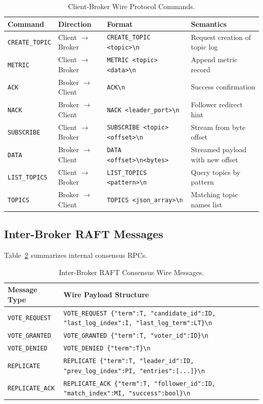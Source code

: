 \documentclass[11pt,a4paper]{article}
\begin{document}
\begin{table}[H]
\centering
\small
\begin{tabular}{@{}llll@{}}
\toprule
\textbf{Command} & \textbf{Direction} & \textbf{Format} & \textbf{Semantics} \\ \midrule
\texttt{CREATE\_TOPIC} & Client $\to$ Broker & \texttt{CREATE\_TOPIC <topic>\textbackslash n} & Request creation of topic log \\
\texttt{METRIC} & Client $\to$ Broker & \texttt{METRIC <topic> <data>\textbackslash n} & Append metric record \\
\texttt{ACK} & Broker $\to$ Client & \texttt{ACK\textbackslash n} & Success confirmation \\
\texttt{NACK} & Broker $\to$ Client & \texttt{NACK <leader\_port>\textbackslash n} & Follower redirect hint \\
\texttt{SUBSCRIBE} & Client $\to$ Broker & \texttt{SUBSCRIBE <topic> <offset>\textbackslash n} & Stream from byte offset \\
\texttt{DATA} & Broker $\to$ Client & \texttt{DATA <offset>\textbackslash n<bytes>} & Streamed payload with new offset \\
\texttt{LIST\_TOPICS} & Client $\to$ Broker & \texttt{LIST\_TOPICS <pattern>\textbackslash n} & Query topics by pattern \\
\texttt{TOPICS} & Broker $\to$ Client & \texttt{TOPICS <json\_array>\textbackslash n} & Matching topic names list \\ \bottomrule
\end{tabular}
\caption{Client-Broker Wire Protocol Commands.}
\label{tab:client_protocol}
\end{table}

\subsection{Inter-Broker RAFT Messages}
Table~\ref{tab:raft_protocol} summarizes internal consensus RPCs.

\begin{table}[H]
\centering
\small
\begin{tabular}{@{}ll@{}}
\toprule
\textbf{Message Type} & \textbf{Wire Payload Structure} \\ \midrule
\texttt{VOTE\_REQUEST} & \texttt{VOTE\_REQUEST \{"term":T, "candidate\_id":ID, "last\_log\_index":I, "last\_log\_term":LT\}\textbackslash n} \\
\texttt{VOTE\_GRANTED} & \texttt{VOTE\_GRANTED \{"term":T, "voter\_id":ID\}\textbackslash n} \\
\texttt{VOTE\_DENIED} & \texttt{VOTE\_DENIED \{"term":T\}\textbackslash n} \\
\texttt{REPLICATE} & \texttt{REPLICATE \{"term":T, "leader\_id":ID, "prev\_log\_index":PI, "entries":[...]\}\textbackslash n} \\
\texttt{REPLICATE\_ACK} & \texttt{REPLICATE\_ACK \{"term":T, "follower\_id":ID, "match\_index":MI, "success":bool\}\textbackslash n} \\ \bottomrule
\end{tabular}
\caption{Inter-Broker RAFT Consensus Wire Messages.}
\label{tab:raft_protocol}
\end{table}
\end{document}
